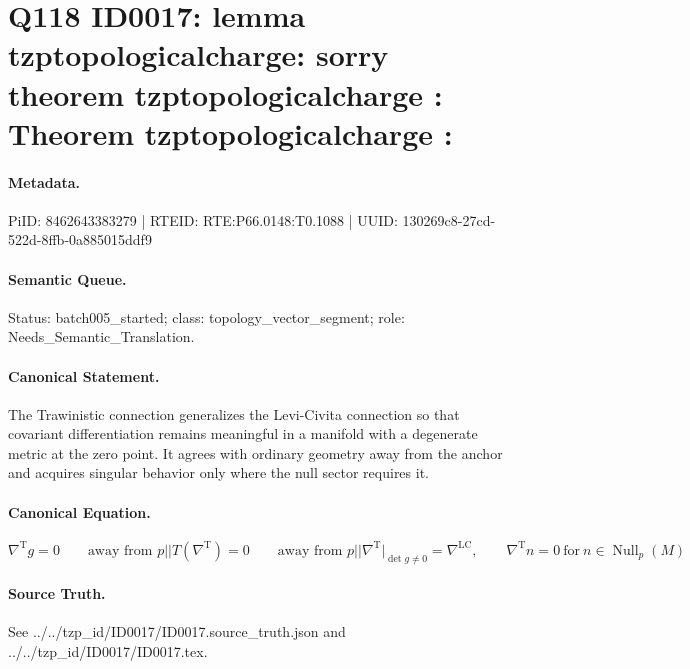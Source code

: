\section*{Q118 ID0017: lemma tzptopologicalcharge: sorry theorem tzptopologicalcharge : Theorem tzptopologicalcharge :}
\paragraph{Metadata.}
PiID: 8462643383279 | RTEID: RTE:P66.0148:T0.1088 | UUID: 130269c8-27cd-522d-8ffb-0a885015ddf9

\paragraph{Semantic Queue.}
Status: batch005\_started; class: topology\_vector\_segment; role: Needs\_Semantic\_Translation.

\paragraph{Canonical Statement.}
The Trawinistic connection generalizes the Levi-Civita connection so that covariant differentiation remains meaningful in a manifold with a degenerate metric at the zero point. It agrees with ordinary geometry away from the anchor and acquires singular behavior only where the null sector requires it.

\paragraph{Canonical Equation.}
\[
\nabla^{\mathrm{T}} g = 0 \qquad \text{away from } p || T(\nabla^{\mathrm{T}})=0 \qquad \text{away from } p || \nabla^{\mathrm{T}}\big\vert_{\det g \neq 0} = \nabla^{\mathrm{LC}}, \qquad \nabla^{\mathrm{T}} n = 0 \ \text{for}\ n \in \operatorname{Null}_{p}(M)
\]

\paragraph{Source Truth.}
See ../../tzp\_id/ID0017/ID0017.source\_truth.json and ../../tzp\_id/ID0017/ID0017.tex.
